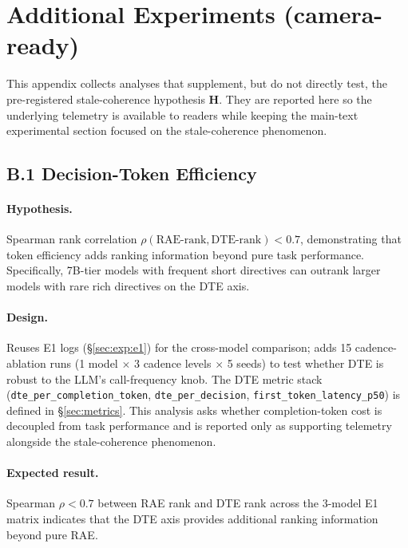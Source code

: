 \section{Additional Experiments (camera-ready)}
\label{app:b-additional}

This appendix collects analyses that supplement, but do not directly
test, the pre-registered stale-coherence hypothesis \textbf{H}. They
are reported here so the underlying telemetry is available to
readers while keeping the main-text experimental section focused on
the stale-coherence phenomenon.

\subsection{B.1 Decision-Token Efficiency}
\label{app:b1}

\paragraph{Hypothesis.} Spearman rank correlation
$\rho(\text{RAE-rank}, \text{DTE-rank}) < 0.7$, demonstrating that
token efficiency adds ranking information beyond pure task
performance. Specifically, 7B-tier models with frequent short
directives can outrank larger models with rare rich directives on
the DTE axis.

\paragraph{Design.} Reuses E1 logs (\S\ref{sec:exp:e1}) for the
cross-model comparison; adds 15 cadence-ablation runs (1 model
$\times$ 3 cadence levels $\times$ 5 seeds) to test whether DTE is
robust to the LLM's call-frequency knob. The DTE metric stack
(\texttt{dte\_per\_completion\_token},
\texttt{dte\_per\_decision}, \texttt{first\_token\_latency\_p50})
is defined in \S\ref{sec:metrics}. This analysis asks whether
completion-token cost is decoupled from task performance and is
reported only as supporting telemetry alongside the stale-coherence
phenomenon.

\paragraph{Expected result.} Spearman $\rho < 0.7$ between RAE rank
and DTE rank across the 3-model E1 matrix indicates that the DTE
axis provides additional ranking information beyond pure RAE.
